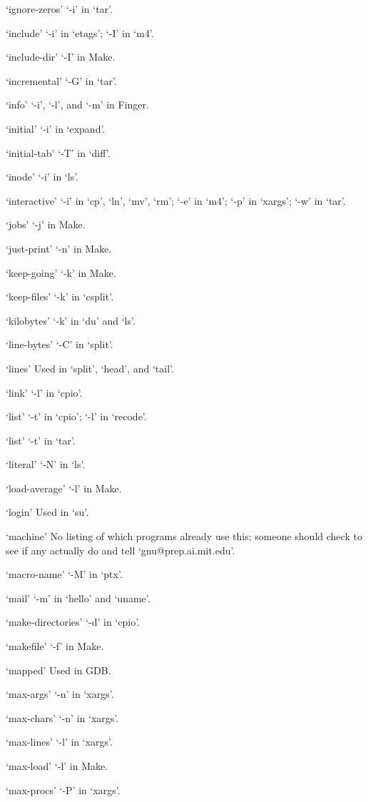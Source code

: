 `ignore-zeros'
     `-i' in `tar'.

`include'
     `-i' in `etags'; `-I' in `m4'.

`include-dir'
     `-I' in Make.

`incremental'
     `-G' in `tar'.

`info'
     `-i', `-l', and `-m' in Finger.

`initial'
     `-i' in `expand'.

`initial-tab'
     `-T' in `diff'.

`inode'
     `-i' in `ls'.

`interactive'
     `-i' in `cp', `ln', `mv', `rm'; `-e' in `m4'; `-p' in `xargs';
     `-w' in `tar'.

`jobs'
     `-j' in Make.

`just-print'
     `-n' in Make.

`keep-going'
     `-k' in Make.

`keep-files'
     `-k' in `csplit'.

`kilobytes'
     `-k' in `du' and `ls'.

`line-bytes'
     `-C' in `split'.

`lines'
     Used in `split', `head', and `tail'.

`link'
     `-l' in `cpio'.

`list'
     `-t' in `cpio'; `-l' in `recode'.

`list'
     `-t' in `tar'.

`literal'
     `-N' in `ls'.

`load-average'
     `-l' in Make.

`login'
     Used in `su'.

`machine'
     No listing of which programs already use this; someone should
     check to see if any actually do and tell `gnu@prep.ai.mit.edu'.

`macro-name'
     `-M' in `ptx'.

`mail'
     `-m' in `hello' and `uname'.

`make-directories'
     `-d' in `cpio'.

`makefile'
     `-f' in Make.

`mapped'
     Used in GDB.

`max-args'
     `-n' in `xargs'.

`max-chars'
     `-n' in `xargs'.

`max-lines'
     `-l' in `xargs'.

`max-load'
     `-l' in Make.

`max-procs'
     `-P' in `xargs'.


